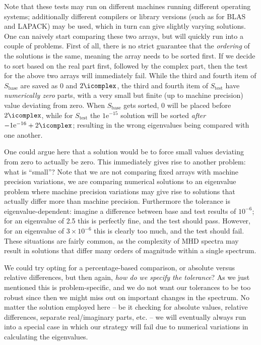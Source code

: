 Note that these tests may run on different machines running different operating systems; additionally different compilers or library versions (such as for BLAS and LAPACK) may be used, which in turn can give slightly varying solutions. One can naively start comparing these two arrays, but will quickly run into a couple of problems. First of all, there is no strict guarantee that the \emph{ordering} of the solutions is the same, meaning the array needs to be sorted first. If we decide to sort based on the real part first, followed by the complex part, then the test for the above two arrays will immediately fail. While the third and fourth item of $S_\text{base}$ are saved as 0 and $2\icomplex$, the third and fourth item of $S_\text{test}$ have \emph{numerically zero} parts, with a very small but finite (up to machine precision) value deviating from zero. When $S_\text{base}$ gets sorted, 0 will be placed before $2\icomplex$, while for $S_\text{test}$ the $1\text{e}^{-15}$ solution will be sorted \emph{after} $-1\text{e}^{-16} + 2\icomplex$; resulting in the wrong eigenvalues being compared with one another.

One could argue here that a solution would be to force small values deviating from zero to actually be zero. This immediately gives rise to another problem: what is ``small''? Note that we are not comparing fixed arrays with machine precision variations, we are comparing numerical solutions to an eigenvalue problem where machine precision variations may give rise to solutions that actually differ more than machine precision. Furthermore the tolerance is eigenvalue-dependent: imagine a difference between base and test results of $10^{-6}$; for an eigenvalue of 2.5 this is perfectly fine, and the test should pass. However, for an eigenvalue of $3 \times 10^{-6}$ this is clearly too much, and the test should fail. These situations are fairly common, as the complexity of MHD spectra may result in solutions that differ many orders of magnitude within a single spectrum.

We could try opting for a percentage-based comparison, or absolute versus relative differences, but then again, \emph{how do we specify the tolerance}? As we just mentioned this is problem-specific, and we do not want our tolerances to be too robust since then we might miss out on important changes in the spectrum. No matter the solution employed here -- be it checking for absolute values, relative differences, separate real/imaginary parts, etc. -- we will eventually always run into a special case in which our strategy will fail due to numerical variations in calculating the eigenvalues.

